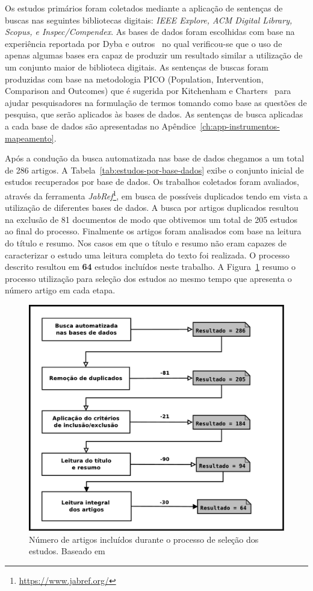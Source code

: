 Os estudos primários foram coletados mediante a aplicação de sentenças de buscas
nas seguintes bibliotecas digitais: \textit{IEEE Explore, ACM Digital Library,
	Scopus, e Inspec/Compendex}. As bases de dados foram escolhidas com base na
experiência reportada por Dyba e outros~\cite{dybaa2007applying}  no qual
verificou-se que o uso de apenas algumas bases era capaz de produzir um
resultado similar a utilização de um conjunto maior de biblioteca digitais. As
sentenças de buscas foram produzidas com base na metodologia PICO (Population,
Intervention, Comparison and Outcomes) que é sugerida por Kitchenham e
Charters~\cite{keele2007guidelines} para ajudar pesquisadores na formulação de
termos tomando como base as questões de pesquisa, que serão aplicados às bases
de dados. As sentenças de busca aplicadas a cada base de dados são apresentadas
no Apêndice~\ref{ch:app-instrumentos-mapeamento}.

Após a condução da busca automatizada nas base de dados chegamos a um total de
286 artigos. A Tabela~\ref{tab:estudos-por-base-dados} exibe o conjunto inicial
de estudos recuperados por base de dados.  Os trabalhos coletados foram
avaliados, através da ferramenta
\textit{JabRef}\footnote{\url{https://www.jabref.org/}}, em busca de possíveis
duplicados tendo em vista a utilização de diferentes bases de dados. A busca por
artigos duplicados resultou na exclusão de 81 documentos de modo que obtivemos
um total de 205 estudos ao final do processo. Finalmente os artigos foram
analisados com base na leitura do título e resumo. Nos casos em que o título e
resumo não eram capazes de caracterizar o estudo uma leitura completa do texto
foi realizada. O processo descrito resultou em \textbf{64} estudos incluídos neste
trabalho. A Figura~\ref{fig:diagrama-processo-selecao} resumo o processo
utilização para seleção dos estudos ao mesmo tempo que apresenta o número artigo
em cada etapa.

\begin{figure} \centering \includegraphics[width=0.75\linewidth]
	{./chapter-mapeamento-sistematico/img/diagrama-processo-selecao.pdf}
	\caption{Número de artigos incluídos durante o processo de seleção dos
		estudos. Baseado
		em~\cite{Petersen2015}}\label{fig:diagrama-processo-selecao}
\end{figure}


